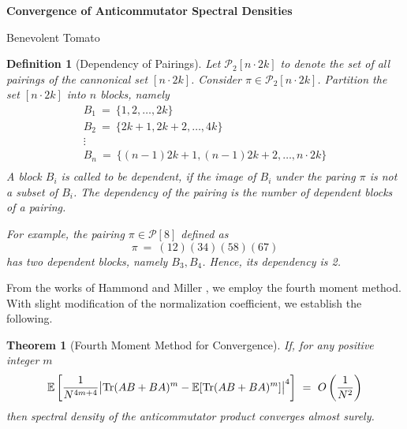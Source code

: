 \documentclass{article}
\newcommand{\red}[1]{
    \color{red}
    {#1}
    \color{black}
}
\newtheorem{theorem}{Theorem}
\newtheorem{defn}{Definition}
\newcommand{\Tr}{\textnormal{Tr}}
\newcommand{\E}{\mathbb{E}}
\begin{document}
\begin{center}
    \Large
    \textbf{Convergence of Anticommutator Spectral Densities}

    \large
    Benevolent Tomato
\end{center}

\begin{comment}
 \begin{eqnarray} \mu_{A_N}(x)dx & \ = \ & \frac{1}{N}
\sum_{i=1}^N
\delta\left(x - \frac{\lambda_i(A_N)}{\sqrt{N}}\right) \nonumber\\
M_m(A_N) & = & \mathbb{R} x^m \mu_{A_N}(x)dx \nonumber\\ M_m(N) & =
& \mathbb{E}[M_m(A_N)] \nonumber\\ M_m &\ =\ & \lim_{N \to \infty} M_m(N).
 \end{eqnarray}
\end{comment}

\begin{defn}[Dependency of Pairings]
    Let $\mathcal{P}_2[n \cdot 2k]$ to denote the set of all pairings of the cannonical set 
    $[n\cdot 2k]$. Consider $\pi \in \mathcal{P}_2[n\cdot 2k]$. Partition the set 
    $[n\cdot 2k]$ into $n$ blocks, namely 
    \begin{eqnarray*}
    B_1 \ = \ \{1, 2, \dots, 2k\} \\ 
    B_2 \ = \ \{2k +1 , 2k +2, \dots, 4k\} \\
    \vdots \\
    B_n \ = \ \{(n - 1)2k +1 , (n - 1)2k +2, \dots, n\cdot 2k\} \\ 
    \end{eqnarray*}
    A block $B_i$ is called to be dependent, if the image of $B_i$ 
    under the paring $\pi$ is not a subset of $B_i$. The dependency 
    of the pairing is the number of dependent blocks of a pairing. 

    For example, the pairing $\pi \in \mathcal{P}[8]$ 
    defined as 
    \[
    \pi \ = \ (12)(34)(58)(67)
    \]
    has two dependent blocks, namely $B_3, B_4$. Hence, 
    its dependency is 2. 
\end{defn}

From the works of \red{Hammond and Miller}, we employ the fourth moment 
method. With slight modification of the normalization coefficient, 
we establish the following. 

\begin{theorem}[Fourth Moment Method for Convergence]
    If, for any positive integer $m$
    \begin{equation}\label{eqn:ForthMom}
        \E \left[
            \frac 1 {N^{4m + 4}}
            \big|
            \Tr(AB + BA)^m - \E[\Tr(AB + BA)^m]
            \big|^4
        \right]
         \ = \ O\left(
                \frac 1 {N^2}
            \right)
    \end{equation}
    then spectral density of the anticommutator product converges 
    almost surely. 
\end{theorem}
\end{document}
